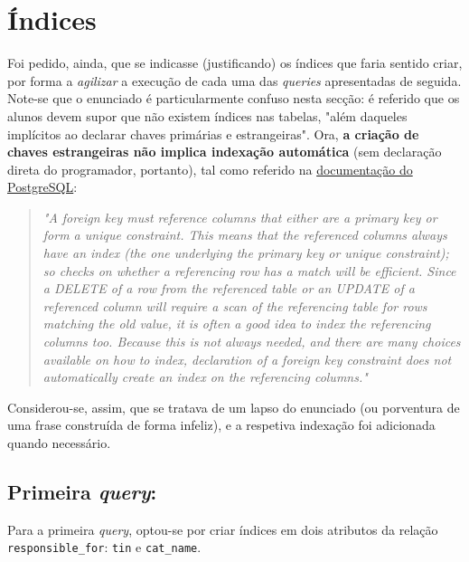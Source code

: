 \documentclass[12pt,a4paper]{article}
\begin{document}
\section*{Índices}

Foi pedido, ainda, que se indicasse (justificando) os índices que faria sentido
criar, por forma a \textit{agilizar} a execução de cada uma das \textit{queries}
apresentadas de seguida. Note-se que o enunciado é particularmente confuso nesta
secção: é referido que os alunos devem supor que não existem índices nas tabelas,
"além daqueles implícitos ao declarar chaves primárias e estrangeiras". Ora, \textbf{a
  criação de chaves estrangeiras não implica indexação automática} (sem declaração
direta do programador, portanto), tal como referido na
\href{https://www.postgresql.org/docs/current/ddl-constraints.html#DDL-CONSTRAINTS-FK}
{documentação do PostgreSQL}:

\begin{quote}
  \textit{"A foreign key must reference columns that either are a primary key or form a unique
    constraint. This means that the referenced columns always have an index (the one
    underlying the primary key or unique constraint); so checks on whether a referencing
    row has a match will be efficient. Since a DELETE of a row from the referenced
    table or an UPDATE of a referenced column will require a scan of the referencing
    table for rows matching the old value, it is often a good idea to index the referencing
    columns too. Because this is not always needed, and there are many choices available
    on how to index, declaration of a foreign key constraint does not automatically
    create an index on the referencing columns."}
\end{quote}

Considerou-se, assim, que se tratava de um lapso do enunciado (ou porventura de uma
frase construída de forma infeliz), e a respetiva indexação foi adicionada quando necessário.

\subsection*{Primeira \textit{query}:}



Para a primeira \textit{query}, optou-se por criar índices em dois atributos da relação \texttt{responsible\_for}:
\texttt{tin} e \texttt{cat\_name}.

\vspace*{0.25cm}
\end{document}
